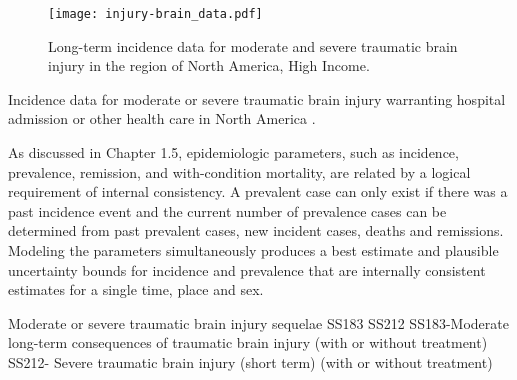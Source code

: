     \begin{figure}[h]
        \begin{center}
            \texttt{[image: injury-brain\_data.pdf]}
            \caption{Long-term incidence data for moderate and severe traumatic brain injury in the region of North America, High Income.}
            \label{fig:app-injury brain data}
        \end{center}
    \end{figure}

Incidence data for moderate or severe traumatic brain injury warranting hospital admission or other health care in North America .

As discussed in Chapter 1.5, epidemiologic parameters, such as incidence, prevalence, remission, and with-condition mortality, are related by a logical requirement of internal consistency.  A prevalent case can only exist if there was a past incidence event and the current number of prevalence cases can be determined from past prevalent cases, new incident cases, deaths and remissions.  Modeling the parameters simultaneously produces a best estimate and plausible uncertainty bounds for incidence and prevalence that are internally consistent estimates for a single time, place and sex.


Moderate or severe traumatic brain injury sequelae SS183 SS212
SS183-Moderate long-term consequences of traumatic brain injury (with or without treatment)
SS212- Severe traumatic brain injury (short term) (with or without treatment)

